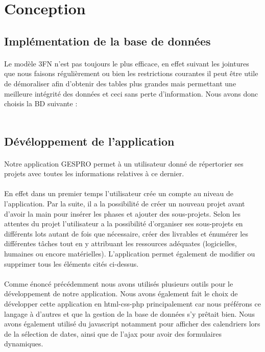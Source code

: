 \documentclass[a4paper, 12pt]{article}
\begin{document}
\section{Conception}
\subsection{Implémentation de la base de données}
\paragraph{}Le modèle 3FN n'est pas toujours le plus efficace, en effet suivant les jointures que nous faisons régulièrement ou bien les restrictions courantes il peut être utile de démoraliser afin d'obtenir des tables plus grandes mais permettant une meilleure intégrité des données et ceci sans perte d'information. Nous avons donc choisis la BD suivante :
\\ \\

\newpage
\subsection{Dévéloppement de l'application}
\paragraph{}Notre application GESPRO permet à un utilisateur donné de répertorier ses projets avec toutes les informations relatives à ce dernier.
\paragraph{}En effet dans un premier temps l’utilisateur crée un compte au niveau de l’application. Par la suite, il a la possibilité de créer un nouveau projet avant d’avoir la main pour insérer les phases et ajouter des sous-projets. Selon les attentes du projet l’utilisateur a la possibilité d’organiser ses sous-projets en différents lots autant de fois que nécessaire,  créer des livrables et énumérer les différentes tâches tout en y attribuant les ressources adéquates (logicielles, humaines ou encore matérielles). L’application permet également de modifier ou supprimer tous les éléments cités ci-dessus. 

\paragraph{}Comme énoncé précédemment nous avons utilisés plusieurs outils pour le développement de notre application. Nous avons également fait le choix de développer cette application en html-css-php principalement car nous préférons ce langage à d'autres et que la gestion de la base de données s'y prêtait bien. Nous avons également utilisé du javascript notamment pour afficher des calendriers lors de la sélection de dates, ainsi que de l'ajax pour avoir des formulaires dynamiques.
\end{document}
